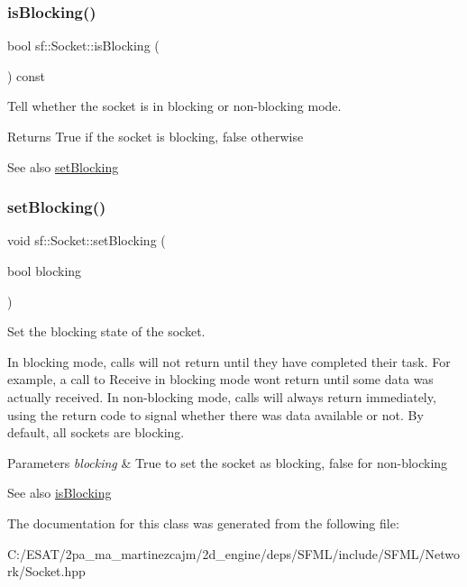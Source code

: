 \subsubsection{\texorpdfstring{is\+Blocking()}{isBlocking()}}
{\footnotesize\ttfamily bool sf\+::\+Socket\+::is\+Blocking (\begin{DoxyParamCaption}{ }\end{DoxyParamCaption}) const}



Tell whether the socket is in blocking or non-\/blocking mode. 

\begin{DoxyReturn}{Returns}
True if the socket is blocking, false otherwise
\end{DoxyReturn}
\begin{DoxySeeAlso}{See also}
\hyperlink{classsf_1_1_socket_a165fc1423e281ea2714c70303d3a9782}{set\+Blocking} 
\end{DoxySeeAlso}
\mbox{\label{classsf_1_1_socket_a165fc1423e281ea2714c70303d3a9782}} 
\subsubsection{\texorpdfstring{set\+Blocking()}{setBlocking()}}
{\footnotesize\ttfamily void sf\+::\+Socket\+::set\+Blocking (\begin{DoxyParamCaption}\item[{bool}]{blocking }\end{DoxyParamCaption})}



Set the blocking state of the socket. 

In blocking mode, calls will not return until they have completed their task. For example, a call to Receive in blocking mode won\textquotesingle{}t return until some data was actually received. In non-\/blocking mode, calls will always return immediately, using the return code to signal whether there was data available or not. By default, all sockets are blocking.


\begin{DoxyParams}{Parameters}
{\em blocking} & True to set the socket as blocking, false for non-\/blocking\\
\hline
\end{DoxyParams}
\begin{DoxySeeAlso}{See also}
\hyperlink{classsf_1_1_socket_ab1ceca9ac114b8baeeda3b34a0aca468}{is\+Blocking} 
\end{DoxySeeAlso}


The documentation for this class was generated from the following file\+:\begin{DoxyCompactItemize}
\item 
C\+:/\+E\+S\+A\+T/2pa\+\_\+ma\+\_\+martinezcajm/2d\+\_\+engine/deps/\+S\+F\+M\+L/include/\+S\+F\+M\+L/\+Network/Socket.\+hpp\end{DoxyCompactItemize}
